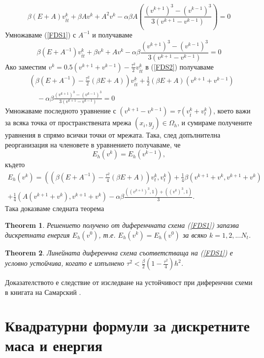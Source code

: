 \documentclass{article}
\newcommand{\be}{\begin{equation}}
\newcommand{\ee}{\end{equation}}
\newcommand{\rf}[1]{(\ref{#1})}
\newtheorem{thm}{Theorem}
\begin{document}
\be\label{FDS1}
\beta (E+A)v_{\bar{t}t}^k +\beta Av^k+A^2 v^k -\alpha \beta A\left(\frac{(v^{k+1})^3-(v^{k-1})^3}{3(v^{k+1}-v^{k-1})} \right)=0
\ee
Умножаваме \rf{FDS1} с $A^{-1}$ и получаваме
\be\label{FDS2}
\beta (E+A^{-1})v_{\bar{t}t}^k +\beta v^k+A v^k -\alpha \beta \frac{(v^{k+1})^3-(v^{k-1})^3}{3(v^{k+1}-v^{k-1})} = 0
\ee
Ако заместим $v^{k}=0.5(v^{k+1}+v^{k-1})-\frac{\tau^2}{2}v_{\bar{t}t}^k$ в \rf{FDS2} получаваме
\begin{align*}
&\left( \beta (E+A^{-1})- \frac{\tau^2}{2}(\beta E+A ) \right)v_{\bar{t}t}^k  + \frac{1}{2} (\beta E +A )(v^{k+1}+v^{k-1}) \\
&~~~~~-\alpha \beta \frac{(v^{k+1})^3-(v^{k-1})^3}{3(v^{k+1}-v^{k-1})} =0
\end{align*}
Умножаваме последното уравнение с $(v^{k+1}-v^{k-1})=\tau (v_{\bar{t}}^k + v_{t}^k)$, което важи за всяка точка от пространствената мрежа $(x_i,y_j) \in \Omega_h$, и сумираме получените уравнения в спрямо всички точки от мрежата. Така, след допълнителна реорганизация на членовете в уравнението получаваме, че
\be \label{num_en}
E_h(v^k) =E_h(v^{k-1}),
\ee
където
\begin{align*}
E_h(v^k)=\left( \left( \beta (E+A^{-1})- \frac{\tau^2}{4}(\beta E+A ) \right)v_{t}^k ,v_{t}^k \right)+\frac{1}{4} \beta \left(  v^{k+1}+v^{k}, v^{k+1}+v^{k} \right) \\
+\frac{1}{4}  \left(  A(v^{k+1}+v^{k}), v^{k+1}+v^{k} \right)
-\alpha \beta \frac{((v^{k+1})^3,1)+((v^{k})^3,1)}{3}.
\end{align*}
Така доказваме следната теорема
\begin{thm}
Решението получено от диференчната схема \rf{FDS1} запазва дискретната енергия $E_h(v^0)$, т.е.  $E_h(v^k) =E_h(v^{0})$ за всяко $k=1,2,...N_t$.
\end{thm}

\begin{thm}
Линейната диференчна схема съответстваща на \rf{FDS1} е условно устойчива, когато е изпълнено
$\tau^2 < \frac{\beta}{2}(1-\frac{\tau^2}{4}) h^2$.

\end{thm}
Доказателството е следствие от изследване на устойчивост при диференчни схеми в книгата на 
Самарский \cite{samarski}.

\section{Квадратурни формули за дискретните маса и енергия}
\end{document}
